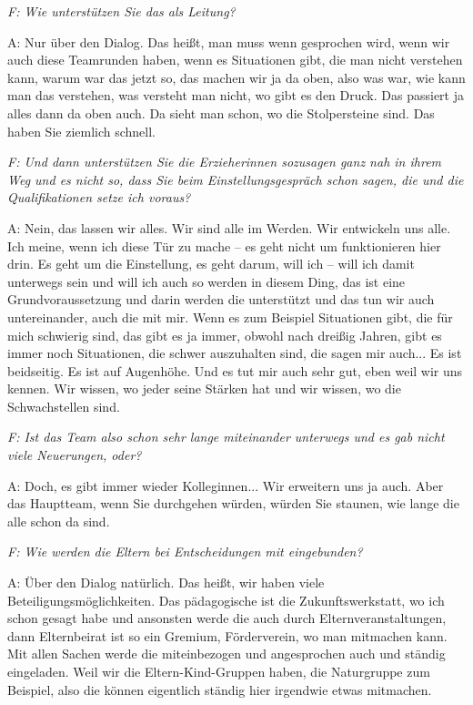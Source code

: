 \begin{linenumbers*}
\emph{F: Wie unterstützen Sie das als Leitung?}

A: Nur über den Dialog. Das heißt, man muss wenn gesprochen wird, wenn wir auch diese Teamrunden haben, wenn es Situationen gibt, die man nicht verstehen kann, warum war das jetzt so, das machen wir ja da oben, also was war, wie kann man das verstehen, was versteht man nicht, wo gibt es den Druck. Das passiert ja alles dann da oben auch. Da sieht man schon, wo die Stolpersteine sind. Das haben Sie ziemlich schnell. 

\emph{F: Und dann unterstützen Sie die Erzieherinnen sozusagen ganz nah in ihrem Weg und es nicht so, dass Sie beim Einstellungsgespräch schon sagen, die und die Qualifikationen setze ich voraus?}

A: Nein, das lassen wir alles. Wir sind alle im Werden. Wir entwickeln uns alle. Ich meine, wenn ich diese Tür zu mache -- es geht nicht um funktionieren hier drin. Es geht um die Einstellung, es geht darum, will ich -- will ich damit unterwegs sein und will ich auch so werden in diesem Ding, das ist eine Grundvoraussetzung und darin werden die unterstützt und das tun wir auch untereinander, auch die mit mir. 
Wenn es zum Beispiel Situationen gibt, die für mich schwierig sind, das gibt es ja immer, obwohl nach dreißig Jahren, gibt es immer noch Situationen, die schwer auszuhalten sind, die sagen mir auch... Es ist beidseitig. Es ist auf Augenhöhe. Und es tut mir auch sehr gut, eben weil wir uns kennen. Wir wissen, wo jeder seine Stärken hat und wir wissen, wo die Schwachstellen sind. 

\emph{F: Ist das Team also schon sehr lange miteinander unterwegs und es gab nicht viele Neuerungen, oder?}
 
A: Doch, es gibt immer wieder Kolleginnen... Wir erweitern uns ja auch. Aber das Hauptteam, wenn Sie durchgehen würden, würden Sie staunen, wie lange die alle schon da sind.   

\emph{F: Wie werden die Eltern bei Entscheidungen mit eingebunden?}

A: Über den Dialog natürlich. Das heißt, wir haben viele Beteiligungsmöglichkeiten. Das pädagogische ist die Zukunftswerkstatt, wo ich schon gesagt habe und ansonsten werde die auch durch Elternveranstaltungen, dann Elternbeirat ist so ein Gremium, Förderverein, wo man mitmachen kann. Mit allen Sachen werde die miteinbezogen und angesprochen auch und ständig eingeladen. Weil wir die Eltern-Kind-Gruppen haben, die Naturgruppe zum Beispiel, also die können eigentlich ständig hier irgendwie etwas mitmachen. 


\end{linenumbers*}

